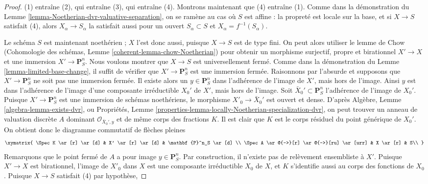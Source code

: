\begin{proof}
(1) entraîne (2), qui entraîne (3), qui entraîne (4). Montrons maintenant que (4) entraîne
(1). Comme dans la démonstration du Lemme \ref{lemma-Noetherian-dvr-valuative-separation},
on se ramène au
cas où $S$ est affine : la propreté est locale sur la base, et si $X
\to S$ satisfait (4), alors $X_\alpha \to S_\alpha$ la satisfait aussi pour
un ouvert $S_\alpha \subset S$ et $X_\alpha = f^{-1}(S_\alpha)$.

\medskip\noindent
Le schéma $S$ est maintenant noethérien ; $X$ l'est donc aussi, puisque $X \to
S$ est de type fini. On peut alors utiliser le lemme de Chow
(Cohomologie des schémas, Lemme \ref{coherent-lemma-chow-Noetherian})
pour obtenir un morphisme surjectif, propre et birationnel
$X' \to X$ et une immersion $X' \to \mathbf{P}^n_S$. Nous voulons
montrer que $X \to S$ est universellement fermé. Comme dans la démonstration du Lemme
\ref{lemma-limited-base-change}, il suffit de vérifier que
$X' \to \mathbf{P}^n_S$ est une immersion fermée.
Raisonnons par l'absurde et supposons que $X' \to
\mathbf{P}^n_S$ ne soit pas une immersion fermée. Il existe alors un $y
\in \mathbf{P}^n_S$ dans l'adhérence de l'image de $X'$,
mais hors de l'image. Ainsi $y$ est dans l'adhérence de l'image d'une
composante irréductible $X_0'$ de $X'$, mais hors de l'image.
Soit $\bar X_0' \subset \mathbf{P}^n_S$ l'adhérence de
l'image de $X_0'$. Puisque $X' \to \mathbf{P}^n_S$ est une immersion
de schémas noethériens, le morphisme $X'_0 \to \bar X_0'$ est
ouvert et dense. D'après
Algèbre, Lemme \ref{algebra-lemma-exists-dvr},
ou
Propriétés, Lemme \ref{properties-lemma-locally-Noetherian-specialization-dvr},
on peut trouver un anneau de valuation discrète $A$ dominant
$\mathcal{O}_{\bar X_0', y}$ et de même corps
des fractions $K$. Il est clair que
$K$ est le corps résiduel du point générique de $X_0'$.
On obtient donc le diagramme commutatif de flèches pleines
\begin{equation}
\label{equation-solid}
\xymatrix{
\Spec K \ar[r] \ar[d] & X' \ar [r] \ar[d] &
\mathbf{P}^n_S \ar[d] \\
\Spec A \ar@{-->}[r] \ar@{-->}[ru] \ar[urr] & X \ar[r] & S\\
}
\end{equation}
Remarquons que le point fermé de $A$ a pour image $y \in \mathbf{P}^n_S$. Par
construction, il n'existe pas de relèvement ensembliste à $X'$.
Puisque $X' \to X$ est birationnel, l'image de $X'_0$ dans $X$ est une
composante irréductible $X_0$ de $X$, et $K$ s'identifie aussi
au corps des fonctions de $X_0$. Puisque $X \to S$ satisfait (4) par hypothèse,

\end{proof}
